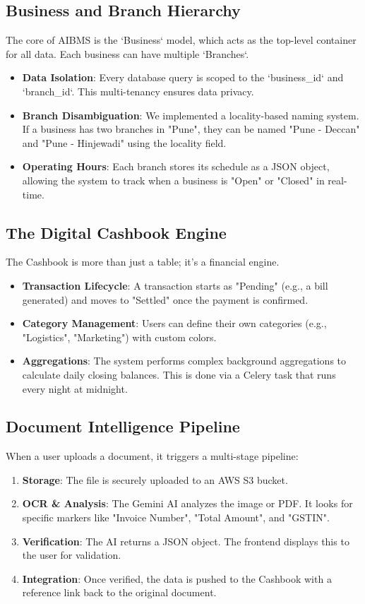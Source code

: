 \documentclass[12pt,a4paper]{report}
\begin{document}
\subsection{Business and Branch Hierarchy}
The core of AIBMS is the `Business` model, which acts as the top-level container for all data. Each business can have multiple `Branches`.
\begin{itemize}
    \item \textbf{Data Isolation}: Every database query is scoped to the `business_id` and `branch_id`. This multi-tenancy ensures data privacy.
    \item \textbf{Branch Disambiguation}: We implemented a locality-based naming system. If a business has two branches in "Pune", they can be named "Pune - Deccan" and "Pune - Hinjewadi" using the locality field.
    \item \textbf{Operating Hours}: Each branch stores its schedule as a JSON object, allowing the system to track when a business is "Open" or "Closed" in real-time.
\end{itemize}

\subsection{The Digital Cashbook Engine}
The Cashbook is more than just a table; it's a financial engine.
\begin{itemize}
    \item \textbf{Transaction Lifecycle}: A transaction starts as "Pending" (e.g., a bill generated) and moves to "Settled" once the payment is confirmed.
    \item \textbf{Category Management}: Users can define their own categories (e.g., "Logistics", "Marketing") with custom colors.
    \item \textbf{Aggregations}: The system performs complex background aggregations to calculate daily closing balances. This is done via a Celery task that runs every night at midnight.
\end{itemize}

\subsection{Document Intelligence Pipeline}
When a user uploads a document, it triggers a multi-stage pipeline:
\begin{enumerate}
    \item \textbf{Storage}: The file is securely uploaded to an AWS S3 bucket.
    \item \textbf{OCR \& Analysis}: The Gemini AI analyzes the image or PDF. It looks for specific markers like "Invoice Number", "Total Amount", and "GSTIN".
    \item \textbf{Verification}: The AI returns a JSON object. The frontend displays this to the user for validation.
    \item \textbf{Integration}: Once verified, the data is pushed to the Cashbook with a reference link back to the original document.
\end{enumerate}
\end{document}
